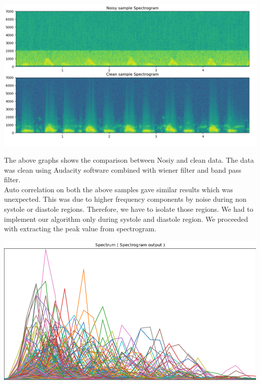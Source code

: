 \documentclass[BTech]{nitkdiss}
\begin{document}
\begin{center}
\includegraphics[scale = 0.4]{spec_cleanvsnoisy.png}
\end{center}

\hspace{0.4cm} The above graphs shows the comparison between Nosiy and clean data. The data was clean using Audacity software combined with wiener filter and band pass filter. \\

\hspace{0.4cm} Auto correlation on both the above samples gave similar results which was unexpected. This was due to higher frequency components by noise during non systole or diastole regions. Therefore, we have to isolate those regions. We had to implement our algorithm only during systole and diastole region. We proceeded with extracting the peak value from spectrogram.\\

\begin{center}
\includegraphics[scale = 0.36]{spectrum.png}
\end{center}
\end{document}
